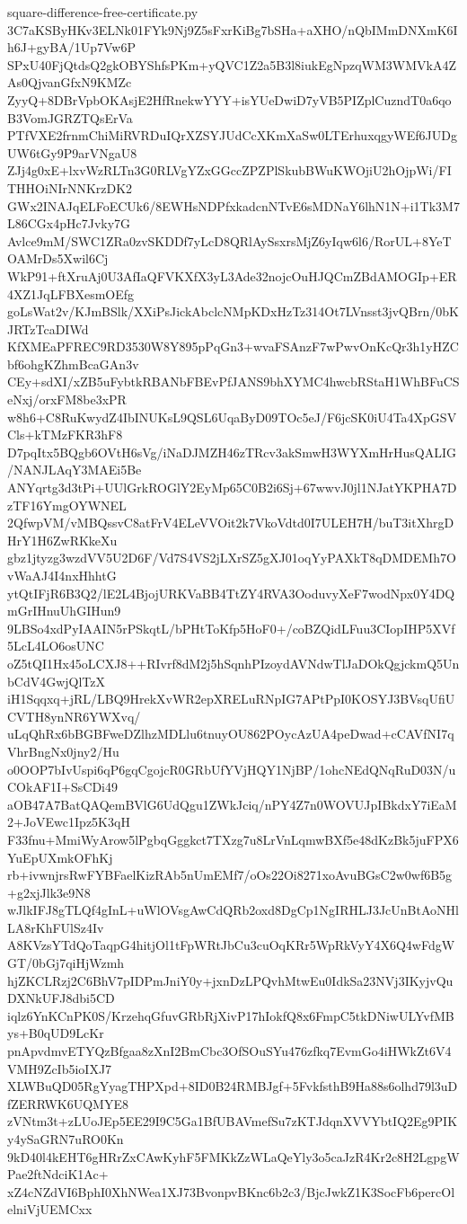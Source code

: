 \documentclass[11pt]{article}
\theoremstyle{definition}
\theoremstyle{remark}
\begin{document}
\begin{filecontents*}[overwrite]{square-difference-free-certificate.py}
3C7aKSByHKv3ELNk01FYk9Nj9Z5sFxrKiBg7bSHa+aXHO/nQbIMmDNXmK6Ih6J+gyBA/1Up7Vw6P
SPxU40FjQtdsQ2gkOBYShfsPKm+yQVC1Z2a5B3l8iukEgNpzqWM3WMVkA4ZAs0QjvanGfxN9KMZc
ZyyQ+8DBrVpbOKAsjE2HfRnekwYYY+isYUeDwiD7yVB5PIZplCuzndT0a6qoB3VomJGRZTQsErVa
PTfVXE2frnmChiMiRVRDuIQrXZSYJUdCcXKmXaSw0LTErhuxqgyWEf6JUDgUW6tGy9P9arVNgaU8
ZJj4g0xE+lxvWzRLTn3G0RLVgYZxGGccZPZPlSkubBWuKWOjiU2hOjpWi/FITHHOiNIrNNKrzDK2
GWx2INAJqELFoECUk6/8EWHsNDPfxkadcnNTvE6sMDNaY6lhN1N+i1Tk3M7L86CGx4pHc7Jvky7G
Avlce9mM/SWC1ZRa0zvSKDDf7yLcD8QRlAySsxrsMjZ6yIqw6l6/RorUL+8YeTOAMrDs5Xwil6Cj
WkP91+ftXruAj0U3AfIaQFVKXfX3yL3Ade32nojcOuHJQCmZBdAMOGIp+ER4XZ1JqLFBXesmOEfg
goLsWat2v/KJmBSlk/XXiPsJickAbclcNMpKDxHzTz314Ot7LVnsst3jvQBrn/0bKJRTzTcaDIWd
KfXMEaPFREC9RD3530W8Y895pPqGn3+wvaFSAnzF7wPwvOnKcQr3h1yHZCbf6ohgKZhmBcaGAn3v
CEy+sdXI/xZB5uFybtkRBANbFBEvPfJANS9bhXYMC4hwcbRStaH1WhBFuCSeNxj/orxFM8be3xPR
w8h6+C8RuKwydZ4IbINUKsL9QSL6UqaByD09TOc5eJ/F6jcSK0iU4Ta4XpGSVCls+kTMzFKR3hF8
D7pqItx5BQgb6OVtH6sVg/iNaDJMZH46zTRcv3akSmwH3WYXmHrHusQALIG/NANJLAqY3MAEi5Be
ANYqrtg3d3tPi+UUlGrkROGlY2EyMp65C0B2i6Sj+67wwvJ0jl1NJatYKPHA7DzTF16YmgOYWNEL
2QfwpVM/vMBQssvC8atFrV4ELeVVOit2k7VkoVdtd0I7ULEH7H/buT3itXhrgDHrY1H6ZwRKkeXu
gbz1jtyzg3wzdVV5U2D6F/Vd7S4VS2jLXrSZ5gXJ01oqYyPAXkT8qDMDEMh7OvWaAJ4I4nxHhhtG
ytQtIFjR6B3Q2/lE2L4BjojURKVaBB4TtZY4RVA3OoduvyXeF7wodNpx0Y4DQmGrIHnuUhGIHun9
9LBSo4xdPyIAAIN5rPSkqtL/bPHtToKfp5HoF0+/coBZQidLFuu3CIopIHP5XVf5LcL4LO6osUNC
oZ5tQI1Hx45oLCXJ8++RIvrf8dM2j5hSqnhPIzoydAVNdwTlJaDOkQgjckmQ5UnbCdV4GwjQlTzX
iH1Sqqxq+jRL/LBQ9HrekXvWR2epXRELuRNpIG7APtPpI0KOSYJ3BVsqUfiUCVTH8ynNR6YWXvq/
uLqQhRx6bBGBFweDZlhzMDLlu6tnuyOU862POycAzUA4peDwad+cCAVfNI7qVhrBngNx0jny2/Hu
o0OOP7bIvUspi6qP6gqCgojcR0GRbUfYVjHQY1NjBP/1ohcNEdQNqRuD03N/uCOkAF1I+SsCDi49
aOB47A7BatQAQemBVlG6UdQgu1ZWkJciq/nPY4Z7n0WOVUJpIBkdxY7iEaM2+JoVEwc1Ipz5K3qH
F33fnu+MmiWyArow5lPgbqGggkct7TXzg7u8LrVnLqmwBXf5e48dKzBk5juFPX6YuEpUXmkOFhKj
rb+ivwnjrsRwFYBFaelKizRAb5nUmEMf7/oOs22Oi8271xoAvuBGsC2w0wf6B5g+g2xjJlk3e9N8
wJlkIFJ8gTLQf4gInL+uWlOVsgAwCdQRb2oxd8DgCp1NgIRHLJ3JcUnBtAoNHlLA8rKhFUlSz4Iv
A8KVzsYTdQoTaqpG4hitjOl1tFpWRtJbCu3cuOqKRr5WpRkVyY4X6Q4wFdgWGT/0bGj7qiHjWzmh
hjZKCLRzj2C6BhV7pIDPmJniY0y+jxnDzLPQvhMtwEu0IdkSa23NVj3IKyjvQuDXNkUFJ8dbi5CD
iqlz6YnKCnPK0S/KrzehqGfuvGRbRjXivP17hIokfQ8x6FmpC5tkDNiwULYvfMBys+B0qUD9LcKr
pnApvdmvETYQzBfgaa8zXnI2BmCbc3OfSOuSYu476zfkq7EvmGo4iHWkZt6V4VMH9ZcIb5ioIXJ7
XLWBuQD05RgYyagTHPXpd+8ID0B24RMBJgf+5FvkfsthB9Ha88s6olhd79l3uDfZERRWK6UQMYE8
zVNtm3t+zLUoJEp5EE29I9C5Ga1BfUBAVmefSu7zKTJdqnXVVYbtIQ2Eg9PIKy4ySaGRN7uRO0Kn
9kD40l4kEHT6gHRrZxCAwKyhF5FMKkZzWLaQeYly3o5caJzR4Kr2c8H2LgpgWPae2ftNdciK1Ac+
xZ4cNZdVI6BphI0XhNWea1XJ73BvonpvBKnc6b2c3/BjcJwkZ1K3SocFb6percOlelniVjUEMCxx

\end{filecontents*}
\end{document}
